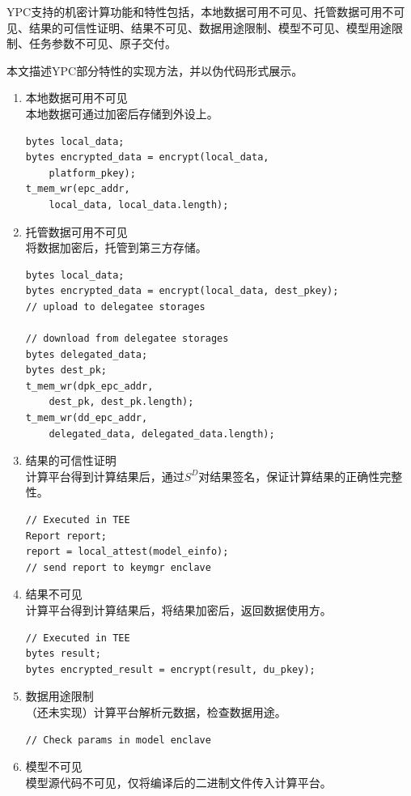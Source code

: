 YPC支持的机密计算功能和特性包括，本地数据可用不可见、托管数据可用不可见、结果的可信性证明、结果不可见、数据用途限制、模型不可见、模型用途限制、任务参数不可见、原子交付。

本文描述YPC部分特性的实现方法，并以伪代码形式展示。

\begin{enumerate}
    \item 本地数据可用不可见\\
    本地数据可通过加密后存储到外设上。

    \begin{lstlisting}
bytes local_data; 
bytes encrypted_data = encrypt(local_data, 
    platform_pkey);
t_mem_wr(epc_addr, 
    local_data, local_data.length); 
    \end{lstlisting}

    \item 托管数据可用不可见\\
    将数据加密后，托管到第三方存储。

    \begin{lstlisting}
bytes local_data; 
bytes encrypted_data = encrypt(local_data, dest_pkey); 
// upload to delegatee storages
        
// download from delegatee storages
bytes delegated_data; 
bytes dest_pk; 
t_mem_wr(dpk_epc_addr, 
    dest_pk, dest_pk.length); 
t_mem_wr(dd_epc_addr, 
    delegated_data, delegated_data.length);   
    \end{lstlisting}

    \item 结果的可信性证明\\ 
    计算平台得到计算结果后，通过$S^D$对结果签名，保证计算结果的正确性完整性。

    \begin{lstlisting}
// Executed in TEE
Report report; 
report = local_attest(model_einfo); 
// send report to keymgr enclave
    \end{lstlisting}

    \item 结果不可见\\ 
    计算平台得到计算结果后，将结果加密后，返回数据使用方。

    \begin{lstlisting}
// Executed in TEE
bytes result; 
bytes encrypted_result = encrypt(result, du_pkey); 
    \end{lstlisting}

    \item 数据用途限制\\ 
    （还未实现）计算平台解析元数据，检查数据用途。
    \begin{lstlisting}
// Check params in model enclave
    \end{lstlisting}
    \item 模型不可见\\ 
    模型源代码不可见，仅将编译后的二进制文件传入计算平台。


\end{enumerate}

